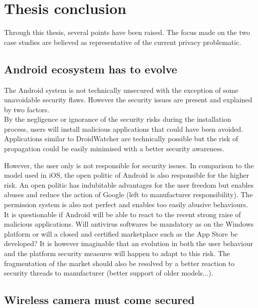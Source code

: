 \chapter{Thesis conclusion}
\label{chap:thesis-ccl}


Through this thesis, several points have been raised.
The focus made on the two case studies are believed as representative of the current privacy problematic.

\section{Android ecosystem has to evolve}

The Android system is not technically unsecured with the exception of some unavoidable security flaws.
However the security issues are present and explained by two factors.\\

By the negligence or ignorance of the security risks during the installation process, users will install malicious applications that could have been avoided.
Applications similar to DroidWatcher are technically possible but the risk of propagation could be easily minimised with a better security awareness.

However, the user only is not responsible for security issues.
In comparison to the model used in iOS, the open politic of Android is also responsible for the higher risk.
An open politic has indubitable advantages for the user freedom but enables abuses and reduce the action of Google (left to manufacturer responsibility).
The permission system is also not perfect and enables too easily abusive behaviours.\\

It is questionable if Android will be able to react to the recent strong raise of malicious applications.
Will antivirus softwares be mandatory as on the Windows platform or will a closed and certified marketplace such as the App Store be developed?
It is however imaginable that an evolution in both the user behaviour and the platform security measures will happen to adapt to this risk.
The fragmentation of the market should also be resolved by a better reaction to security threads to manufacturer (better support of older models...).

\section{Wireless camera must come secured}

